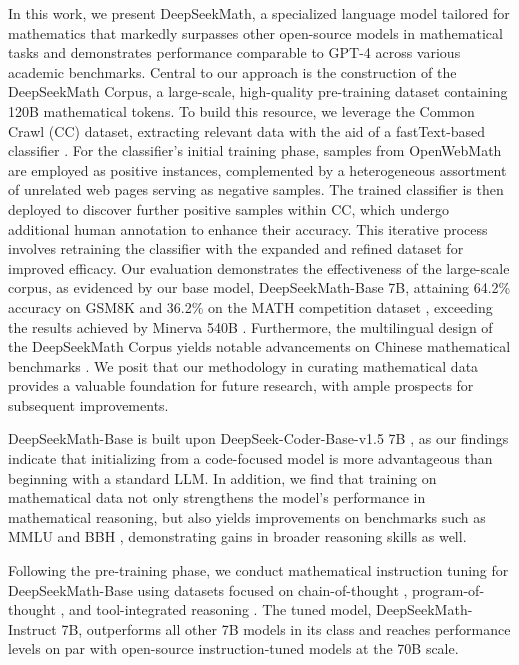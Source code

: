 In this work, we present DeepSeekMath, a specialized language model tailored for mathematics that markedly surpasses other open-source models in mathematical tasks and demonstrates performance comparable to GPT-4 across various academic benchmarks. Central to our approach is the construction of the DeepSeekMath Corpus, a large-scale, high-quality pre-training dataset containing 120B mathematical tokens. To build this resource, we leverage the Common Crawl (CC) dataset, extracting relevant data with the aid of a fastText-based classifier \citep{joulin2016fasttext}. For the classifier’s initial training phase, samples from OpenWebMath \citep{openwebmath} are employed as positive instances, complemented by a heterogeneous assortment of unrelated web pages serving as negative samples. The trained classifier is then deployed to discover further positive samples within CC, which undergo additional human annotation to enhance their accuracy. This iterative process involves retraining the classifier with the expanded and refined dataset for improved efficacy. Our evaluation demonstrates the effectiveness of the large-scale corpus, as evidenced by our base model, DeepSeekMath-Base 7B, attaining 64.2\% accuracy on GSM8K \citep{gsm8k} and 36.2\% on the MATH competition dataset \citep{MATH}, exceeding the results achieved by Minerva 540B \citep{minerva}. Furthermore, the multilingual design of the DeepSeekMath Corpus yields notable advancements on Chinese mathematical benchmarks \citep{wei2023cmath,agieval}. We posit that our methodology in curating mathematical data provides a valuable foundation for future research, with ample prospects for subsequent improvements.

DeepSeekMath-Base is built upon DeepSeek-Coder-Base-v1.5 7B \citep{deepseek-coder}, as our findings indicate that initializing from a code-focused model is more advantageous than beginning with a standard LLM. In addition, we find that training on mathematical data not only strengthens the model's performance in mathematical reasoning, but also yields improvements on benchmarks such as MMLU \citep{mmlu} and BBH \citep{bbh}, demonstrating gains in broader reasoning skills as well.

Following the pre-training phase, we conduct mathematical instruction tuning for DeepSeekMath-Base using datasets focused on chain-of-thought \citep{cot}, program-of-thought \citep{pot,pal}, and tool-integrated reasoning \citep{tora}. The tuned model, DeepSeekMath-Instruct 7B, outperforms all other 7B models in its class and reaches performance levels on par with open-source instruction-tuned models at the 70B scale.


